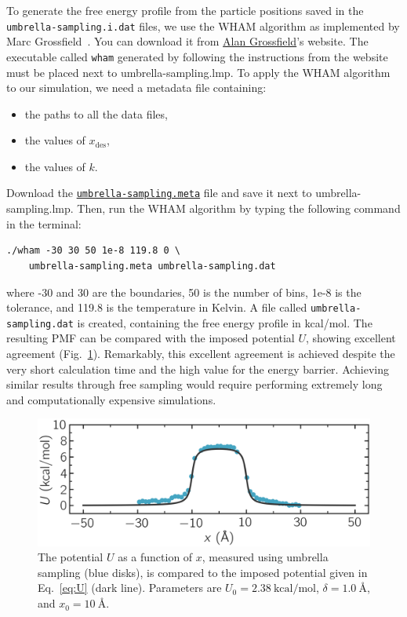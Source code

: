 \documentclass[9pt,tutorial]{livecoms}
\newcommand{\lmpcmd}[1]{\hspace{0pt}\colorbox{listing}{\textcolor{command}{\small{#1}}}\hspace{0pt}} %
\newcommand{\flecmd}[1]{\textcolor{command}{\texttt{#1}}} %
\newcommand{\dwlcmd}[1]{\textcolor{download}{\texttt{#1}}} %
\newcommand{\filepath}{https://raw.githubusercontent.com/lammpstutorials/lammpstutorials-article/main/files/}
\begin{document}
To generate the free energy profile from the particle positions
saved in the \flecmd{umbrella-sampling.i.dat} files,
we use the WHAM algorithm as implemented by Marc Grossfield~\cite{grossfieldimplementation}.
You can download it from \href{http://membrane.urmc.rochester.edu/?page_id=126}{Alan Grossfield}'s
website.  The executable called \flecmd{wham} generated by following the instructions
from the website must be placed next to \lmpcmd{umbrella-sampling.lmp}.  To apply
the WHAM algorithm to our simulation, we need a metadata file containing:
\begin{itemize}
\item the paths to all the data files,
\item the values of $x_\text{des}$,
\item the values of $k$.
\end{itemize}
Download the \href{\filepath tutorial7/umbrella-sampling.meta}{\dwlcmd{umbrella-sampling.meta}} file
and save it next to \lmpcmd{umbrella-sampling.lmp}.  Then, run the WHAM algorithm
by typing the following command in the terminal:
\begin{lstlisting}
./wham -30 30 50 1e-8 119.8 0 \
    umbrella-sampling.meta umbrella-sampling.dat
\end{lstlisting}
where -30 and 30 are the boundaries, 50 is the number of bins, 1e-8 is the tolerance,
and 119.8 is the temperature in Kelvin.  A file called \flecmd{umbrella-sampling.dat} is created,
containing the free energy profile in kcal/mol.  The resulting PMF can be compared
with the imposed potential $U$, showing excellent agreement
(Fig.~\ref{fig:US-freenergy}).  Remarkably, this excellent agreement is achieved despite
the very short calculation time and the high value for the energy barrier.
Achieving similar results through free sampling would require performing extremely
long and computationally expensive simulations.

\begin{figure}
\centering
\includegraphics[width=\linewidth]{US-free-energy}
\caption{The potential $U$ as a function of $x$, measured using umbrella sampling
(blue disks), is compared to the imposed potential given in Eq.~\eqref{eq:U}
(dark line). Parameters are $U_0 = 2.38~\text{kcal/mol}$, $\delta = 1.0~\text{\AA{}}$,
and $x_0 = 10~\text{\AA{}}$.}
\label{fig:US-freenergy}
\end{figure}
\end{document}
